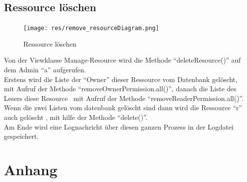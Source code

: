 \documentclass[parskip=full,11pt]{scrartcl}
\begin{document}
 \subsection{Ressource löschen}
 \begin{figure}[ht!]
 	\centering
 	\texttt{[image: res/remove\_resourceDiagram.png]}
 	\caption{Ressource löschen}
 \end{figure}
 
 
 Von der Viewklasse Manage-Resource wird die Methode \enquote{deleteResource()} auf dem Admin \enquote{a}  aufgerufen.\\ Erstens wird die Liste der \enquote{Owner} dieser Ressource vom Datenbank gelöscht, mit Aufruf der Methode \enquote{removeOwnerPermission.all()}, danach die Liste des Lesers diese Resource \ mit Aufruf der Methode \enquote{removeReaderPermission.all()}.\\
 Wenn die zwei Listen vom datenbank gelöscht sind dann wird die Ressource \enquote{r} auch gelöscht , mit hilfe der Methode \enquote{delete()}.\\ Am Ende wird eine Lognachricht über diesen ganzen Prozess  in der Logdatei gespeichert.\\
 
 \newpage
 \section{Anhang}
 \newpage
{}
\printglossary	
	
 
\end{document}
